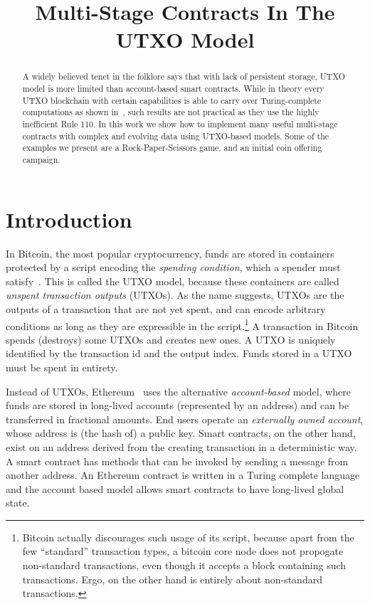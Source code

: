 \documentclass[11pt]{article}
\newcommand{\langname}{ErgoScript\xspace}
\begin{document}
\title{Multi-Stage Contracts In The UTXO Model}




\maketitle


\begin{abstract}
A widely believed tenet in the folklore says that with lack of persistent storage, UTXO model is more limited than account-based smart contracts. While in theory every UTXO blockchain with certain capabilities is able to carry over Turing-complete computations as shown in~\cite{CMK18}, such results are not practical as they use the highly inefficient Rule 110.
In this work we show how to implement many useful multi-stage contracts with complex and evolving data using UTXO-based models. Some of the examples we present are a Rock-Paper-Scissors game, and an initial coin offering campaign.
\end{abstract}

\section{Introduction}

In Bitcoin, the most popular cryptocurrency, funds are stored in containers protected by a script encoding the {\em spending condition}, which a spender must satisfy~\cite{Nak08}. This is called the UTXO model, because these containers are called {\em unspent transaction outputs} (UTXOs). As the name suggests, UTXOs are the outputs of a transaction that are not yet spent, and can encode arbitrary conditions as long as they are expressible in the script.\footnote{Bitcoin actually discourages such usage of its script, because apart from the few ``standard'' transaction types, a bitcoin core node does not propogate non-standard transactions, even though it accepts a block containing such transactions. Ergo, on the other hand is entirely about non-standard transactions.} A transaction in Bitcoin spends (destroys) some UTXOs and creates new ones. A UTXO is uniquely identified by the transaction id and the output index. Funds stored in a UTXO must be spent in entirety. 

Instead of UTXOs, Ethereum~\cite{wood2014ethereum} uses the alternative {\em account-based} model, where funds are stored in long-lived accounts (represented by an address) and can be transferred in fractional amounts. End users operate an {\em externally owned account}, whose address is (the hash of) a public key. Smart contracts, on the other hand, exist on an address derived from the creating transaction in a deterministic way. A smart contract has methods that can be invoked by sending a message from another address. An Ethereum contract is written in a Turing complete language and the account based model allows smart contracts to have long-lived global state. %
\end{document}
